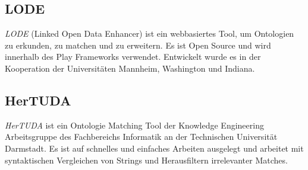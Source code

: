 		\subsection{LODE}
		\textit{LODE} (Linked Open Data Enhancer) ist ein webbasiertes Tool, um
		Ontologien zu erkunden, zu matchen und zu erweitern. Es ist Open Source  und wird innerhalb des Play Frameworks   verwendet. Entwickelt wurde es in der Kooperation der Universitäten Mannheim, Washington und Indiana.
		
		\subsection{HerTUDA}
		\textit{HerTUDA} ist ein Ontologie Matching Tool der Knowledge Engineering
		Arbeitsgruppe des Fachbereichs Informatik an der Technischen Universität Darmstadt. Es ist auf schnelles und einfaches Arbeiten ausgelegt und arbeitet mit syntaktischen Vergleichen von Strings und Herausfiltern irrelevanter Matches.
		
		\cleardoublepage
		\pagebreak[4]